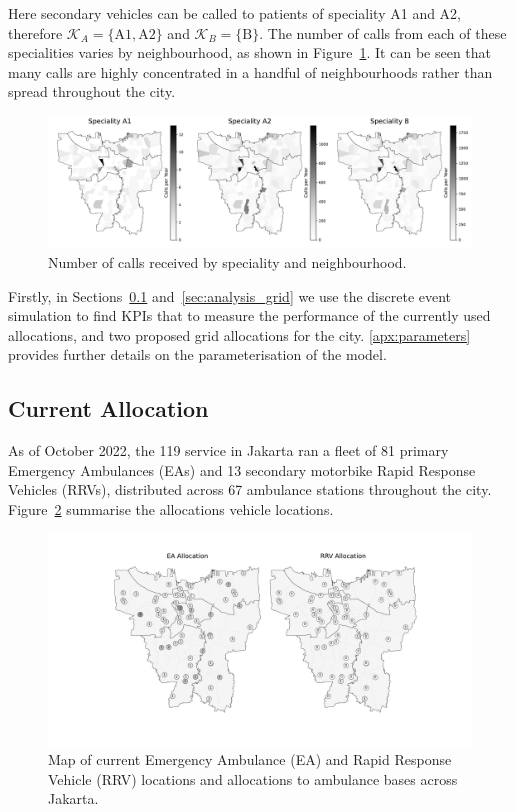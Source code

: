 \documentclass[preprint,12pt]{elsarticle}
\begin{document}
Here secondary vehicles can be called to patients of speciality A1 and A2,
therefore $\mathcal{K}_A = \{\text{A1}, \text{A2}\}$ and
$\mathcal{K}_B = \{\text{B}\}$.
The number of calls from each of these specialities varies by neighbourhood,
as shown in Figure~\ref{fig:yearly_demand}. It can be seen that many calls are
highly concentrated in a handful of neighbourhoods rather than spread
throughout the city.

\begin{figure}
\begin{center}
\includegraphics[width=\textwidth]{img/yearly_demand.pdf}
\end{center}
\caption{Number of calls received by speciality and neighbourhood.}
\label{fig:yearly_demand}
\end{figure}

Firstly, in Sections~\ref{sec:analysis_current} and~\ref{sec:analysis_grid} we
use the discrete event simulation to find KPIs that to measure the performance
of the currently used allocations, and two proposed grid allocations for the
city. \ref{apx:parameters} provides further details on the parameterisation of
the model.

\subsection{Current Allocation}\label{sec:analysis_current}
As of October 2022, the 119 service in Jakarta ran a fleet of 81 primary
Emergency Ambulances (EAs) and 13 secondary motorbike Rapid Response Vehicles
(RRVs), distributed across 67 ambulance stations throughout the city.
Figure~\ref{fig:current_allocation} summarise the allocations vehicle
locations. 

\begin{figure}
\begin{center}
\includegraphics[width=\textwidth]{img/map_current}
\caption{Map of current Emergency Ambulance (EA) and Rapid Response Vehicle
         (RRV) locations and allocations to ambulance bases across Jakarta.}
\label{fig:current_allocation}
\end{center}
\end{figure}
\end{document}

